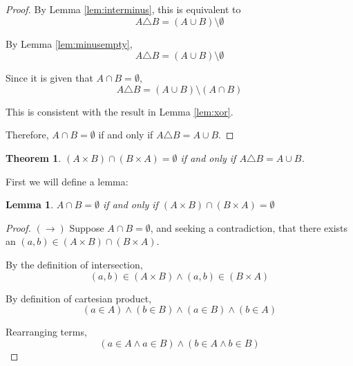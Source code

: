\documentclass{article}
\newtheorem{theorem}{Theorem}
\newtheorem{lemma}{Lemma}
\begin{document}
\begin{outline}[enumerate]
\begin{proof}
        By Lemma \ref{lem:interminus}, this is equivalent to 
        \begin{equation}
            A \triangle B = (A \cup B) \setminus \emptyset
        \end{equation}

        By Lemma \ref{lem:minusempty},
        \begin{equation}
            A \triangle B = (A \cup B) \setminus \emptyset
        \end{equation}

        Since it is given that $A \cap B = \emptyset$, 
        \begin{equation}
            A \triangle B = (A \cup B) \setminus (A \cap B)
        \end{equation}

        This is consistent with the result in Lemma \ref{lem:xor}.

        Therefore, $A \cap B = \emptyset$ if and only if $A \triangle B = A \cup B$.
    \end{proof}

    \1 \begin{theorem}
        $(A \times B) \cap (B \times A) = \emptyset$ if and only if $A \triangle B = A \cup B$. 
        \label{thm:cartemptyset}
    \end{theorem}

    First we will define a lemma:
    \begin{lemma}
        $A \cap B = \emptyset$ if and only if $(A \times B) \cap (B \times A) = \emptyset$
        \label{lem:captimescaptimes}
    \end{lemma}

    \begin{proof}
        $(\rightarrow)$ Suppose $A \cap B = \emptyset$, and seeking a contradiction, that there exists an $(a, b) \in (A \times B) \cap (B \times A)$.

        By the definition of intersection,
        \begin{equation}
            (a, b) \in (A \times B) \wedge (a, b) \in (B \times A)
        \end{equation}

        By definition of cartesian product,
        \begin{equation}
            (a \in A) \wedge (b \in B) \wedge (a \in B) \wedge (b \in A)
        \end{equation}

        Rearranging terms,
        \begin{equation}
            (a \in A \wedge a \in B) \wedge (b \in A \wedge b \in B)
        \end{equation}


\end{proof}
\end{outline}
\end{document}
